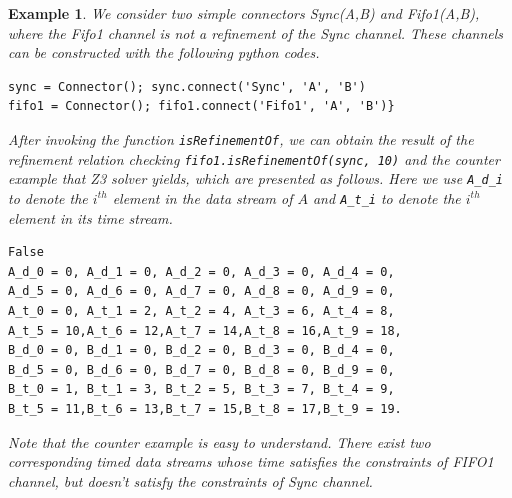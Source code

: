 \documentclass[preprint,3p]{elsarticle}
\newtheorem{example}{Example}[section]
\begin{document}
\begin{example}
We consider two simple connectors \emph{Sync(A,B)} and \emph{Fifo1(A,B)}, where the \emph{Fifo1} channel is not a refinement of the \emph{Sync} channel. These channels can be constructed with the following python codes.
\begin{lstlisting}
sync = Connector(); sync.connect('Sync', 'A', 'B')
fifo1 = Connector(); fifo1.connect('Fifo1', 'A', 'B')}
\end{lstlisting}
After invoking the function \texttt{isRefinementOf}, we can obtain the result of the refinement relation checking \texttt{fifo1.isRefinementOf(sync, 10)} and the counter example that Z3 solver yields, which are presented as follows. Here we use \texttt{A\_d\_i} to denote the $i^{th}$ element in the data stream of $A$ and \texttt{A\_t\_i} to denote the $i^{th}$ element in its time stream.
\begin{lstlisting}
False
A_d_0 = 0, A_d_1 = 0, A_d_2 = 0, A_d_3 = 0, A_d_4 = 0,
A_d_5 = 0, A_d_6 = 0, A_d_7 = 0, A_d_8 = 0, A_d_9 = 0,
A_t_0 = 0, A_t_1 = 2, A_t_2 = 4, A_t_3 = 6, A_t_4 = 8,
A_t_5 = 10,A_t_6 = 12,A_t_7 = 14,A_t_8 = 16,A_t_9 = 18,
B_d_0 = 0, B_d_1 = 0, B_d_2 = 0, B_d_3 = 0, B_d_4 = 0,
B_d_5 = 0, B_d_6 = 0, B_d_7 = 0, B_d_8 = 0, B_d_9 = 0,
B_t_0 = 1, B_t_1 = 3, B_t_2 = 5, B_t_3 = 7, B_t_4 = 9,
B_t_5 = 11,B_t_6 = 13,B_t_7 = 15,B_t_8 = 17,B_t_9 = 19.
\end{lstlisting}

Note that the counter example is easy to understand. There exist two corresponding timed data streams whose time satisfies the constraints of \emph{FIFO1} channel, but doesn't satisfy the constraints of \emph{Sync} channel.
\end{example}
\end{document}
